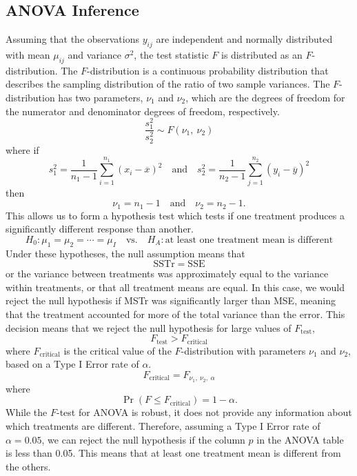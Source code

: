 \documentclass{article}
\begin{document}
\subsection{ANOVA Inference}
Assuming that the observations \(y_{ij}\) are independent and normally
distributed with mean \(\mu_{ij}\) and variance \(\sigma^2\), the test
statistic \(F\) is distributed as an \(F\)-distribution. The
\(F\)-distribution is a continuous probability distribution that
describes the sampling distribution of the ratio of two sample
variances. The \(F\)-distribution has two parameters, \(\nu_1\) and
\(\nu_2\), which are the degrees of freedom for the numerator and
denominator degrees of freedom, respectively.
\begin{equation*}
    \frac{s_1^2}{s_2^2} \sim F\left( \nu_1,\: \nu_2 \right)
\end{equation*}
where if
\begin{equation*}
    s_1^2 = \frac{1}{n_1 - 1} \sum_{i = 1}^{n_1} \left( x_i - \overline{x} \right)^2 \quad \text{and} \quad s_2^2 = \frac{1}{n_2 - 1} \sum_{j = 1}^{n_2} \left( y_i - \overline{y} \right)^2
\end{equation*}
then
\begin{equation*}
    \nu_1 = n_1 - 1 \quad \text{and} \quad \nu_2 = n_2 - 1.
\end{equation*}
This allows us to form a hypothesis test which tests if one treatment produces a significantly different response than another.
\begin{equation*}
    H_0: \mu_1 = \mu_2 = \cdots = \mu_I \quad \text{vs.} \quad H_A: \text{at least one treatment mean is different}
\end{equation*}
Under these hypotheses, the null assumption means that
\begin{equation*}
    \mathrm{SSTr} = \mathrm{SSE}
\end{equation*}
or the variance between treatments was approximately equal to the variance within treatments, or that
all treatment means are equal. In this case, we would reject the null hypothesis if MSTr was significantly larger than MSE,
meaning that the treatment accounted for more of the total variance than the error. This decision means that we reject the null hypothesis for large values
of \(F_{\mathrm{test}}\),
\begin{equation*}
    F_{\mathrm{test}} > F_\mathrm{critical}
\end{equation*}
where \(F_\mathrm{critical}\) is the critical value of the \(F\)-distribution with parameters \(\nu_1\) and \(\nu_2\), based
on a Type I Error rate of \(\alpha\).
\begin{equation*}
    F_\mathrm{critical} = F_{\nu_1,\: \nu_2,\: \alpha}
\end{equation*}
where
\begin{equation*}
    \Pr{\left( F \leq F_\mathrm{critical} \right)} = 1 - \alpha.
\end{equation*}
While the \(F\)-test for ANOVA is robust, it does not provide any information about which treatments are different. Therefore, assuming a Type I Error rate of \(\alpha = 0.05\), we can
reject the null hypothesis if the column \(p\) in the ANOVA table is
less than 0.05. This means that at least one treatment mean is
different from the others.
\end{document}
